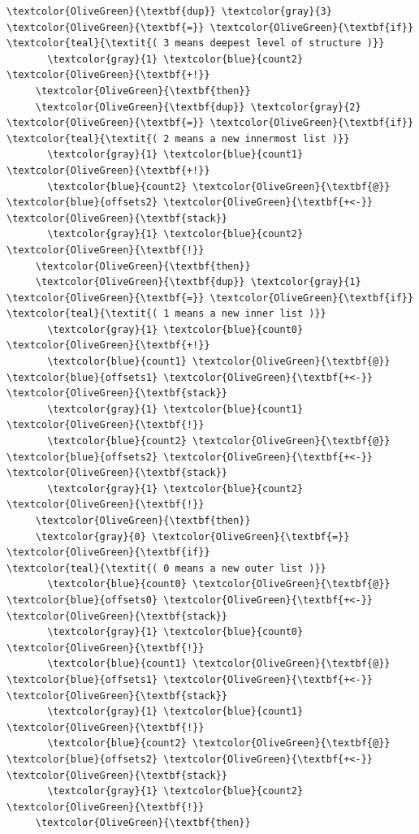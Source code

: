\documentclass{webofc}
\begin{document}
\begin{Verbatim}[commandchars=\\\{\}]
     \textcolor{OliveGreen}{\textbf{dup}} \textcolor{gray}{3} \textcolor{OliveGreen}{\textbf{=}} \textcolor{OliveGreen}{\textbf{if}}                    \textcolor{teal}{\textit{( 3 means deepest level of structure )}}
       \textcolor{gray}{1} \textcolor{blue}{count2} \textcolor{OliveGreen}{\textbf{+!}}
     \textcolor{OliveGreen}{\textbf{then}}
     \textcolor{OliveGreen}{\textbf{dup}} \textcolor{gray}{2} \textcolor{OliveGreen}{\textbf{=}} \textcolor{OliveGreen}{\textbf{if}}                    \textcolor{teal}{\textit{( 2 means a new innermost list )}}
       \textcolor{gray}{1} \textcolor{blue}{count1} \textcolor{OliveGreen}{\textbf{+!}}
       \textcolor{blue}{count2} \textcolor{OliveGreen}{\textbf{@}} \textcolor{blue}{offsets2} \textcolor{OliveGreen}{\textbf{+<-}} \textcolor{OliveGreen}{\textbf{stack}}
       \textcolor{gray}{1} \textcolor{blue}{count2} \textcolor{OliveGreen}{\textbf{!}}
     \textcolor{OliveGreen}{\textbf{then}}
     \textcolor{OliveGreen}{\textbf{dup}} \textcolor{gray}{1} \textcolor{OliveGreen}{\textbf{=}} \textcolor{OliveGreen}{\textbf{if}}                    \textcolor{teal}{\textit{( 1 means a new inner list )}}
       \textcolor{gray}{1} \textcolor{blue}{count0} \textcolor{OliveGreen}{\textbf{+!}}
       \textcolor{blue}{count1} \textcolor{OliveGreen}{\textbf{@}} \textcolor{blue}{offsets1} \textcolor{OliveGreen}{\textbf{+<-}} \textcolor{OliveGreen}{\textbf{stack}}
       \textcolor{gray}{1} \textcolor{blue}{count1} \textcolor{OliveGreen}{\textbf{!}}
       \textcolor{blue}{count2} \textcolor{OliveGreen}{\textbf{@}} \textcolor{blue}{offsets2} \textcolor{OliveGreen}{\textbf{+<-}} \textcolor{OliveGreen}{\textbf{stack}}
       \textcolor{gray}{1} \textcolor{blue}{count2} \textcolor{OliveGreen}{\textbf{!}}
     \textcolor{OliveGreen}{\textbf{then}}
     \textcolor{gray}{0} \textcolor{OliveGreen}{\textbf{=}} \textcolor{OliveGreen}{\textbf{if}}                        \textcolor{teal}{\textit{( 0 means a new outer list )}}
       \textcolor{blue}{count0} \textcolor{OliveGreen}{\textbf{@}} \textcolor{blue}{offsets0} \textcolor{OliveGreen}{\textbf{+<-}} \textcolor{OliveGreen}{\textbf{stack}}
       \textcolor{gray}{1} \textcolor{blue}{count0} \textcolor{OliveGreen}{\textbf{!}}
       \textcolor{blue}{count1} \textcolor{OliveGreen}{\textbf{@}} \textcolor{blue}{offsets1} \textcolor{OliveGreen}{\textbf{+<-}} \textcolor{OliveGreen}{\textbf{stack}}
       \textcolor{gray}{1} \textcolor{blue}{count1} \textcolor{OliveGreen}{\textbf{!}}
       \textcolor{blue}{count2} \textcolor{OliveGreen}{\textbf{@}} \textcolor{blue}{offsets2} \textcolor{OliveGreen}{\textbf{+<-}} \textcolor{OliveGreen}{\textbf{stack}}
       \textcolor{gray}{1} \textcolor{blue}{count2} \textcolor{OliveGreen}{\textbf{!}}
     \textcolor{OliveGreen}{\textbf{then}}


\end{Verbatim}
\end{document}
